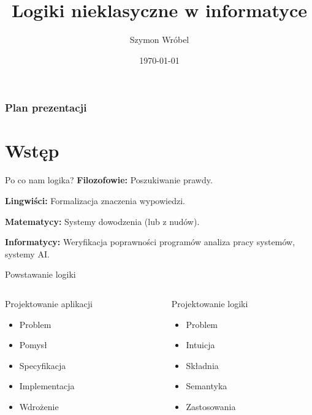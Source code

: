 \documentclass{beamer}
\title[Logiki nieklasyczne]{Logiki nieklasyczne w informatyce}
\author{Szymon Wróbel}
\date{\today}
\begin{document}
\begin{frame}
\titlepage
\end{frame}

\begin{frame}
\frametitle{Plan prezentacji}
\tableofcontents
\end{frame}


\section{Wstęp}
\begin{frame}{Po co nam logika?}
  \pause \textbf{Filozofowie:} Poszukiwanie prawdy.

  \pause \textbf{Lingwiści:} Formalizacja znaczenia wypowiedzi.

  \pause \textbf{Matematycy:} Systemy dowodzenia \pause (lub z nudów).

  \pause \textbf{Informatycy:} Weryfikacja poprawności programów analiza pracy systemów, systemy AI.
\end{frame}

\begin{frame}{Powstawanie logiki}
  \begin{columns}
    \begin{column}{0.5\textwidth}
      Projektowanie aplikacji

      \begin{itemize}[<+->]
        \item Problem
        \item Pomysł
        \item Specyfikacja
        \item Implementacja
        \item Wdrożenie
      \end{itemize}
    \end{column}

    \pause

    \begin{column}{0.5\textwidth}
      Projektowanie logiki
      \begin{itemize}[<+->]
        \item Problem
        \item Intuicja
        \item Składnia
        \item Semantyka
        \item Zastosowania
      \end{itemize}
    \end{column}
  \end{columns}
\end{frame}
\end{document}
